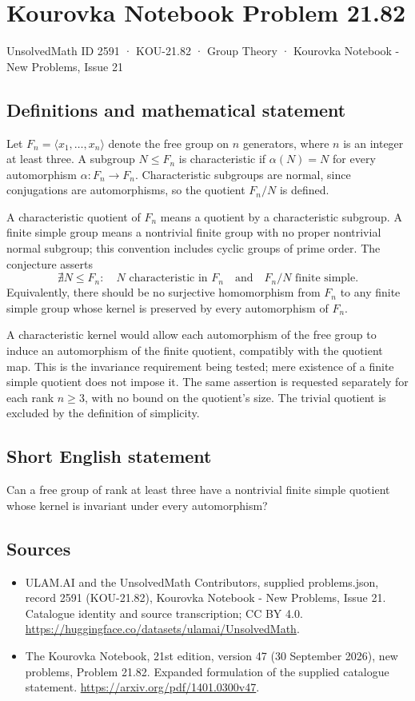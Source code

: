 \documentclass[11pt,a4paper]{article}
\begin{document}
\section*{Kourovka Notebook Problem 21.82}\label{2591}
{\small UnsolvedMath ID 2591 · KOU-21.82 · Group Theory · Kourovka Notebook - New Problems, Issue 21}
\subsection{Definitions and mathematical statement}
Let $F_n=\langle x_1,\ldots,x_n\rangle$ denote the free group on $n$ generators, where $n$ is an integer at least three. A subgroup $N\le F_n$ is characteristic if $\alpha(N)=N$ for every automorphism $\alpha:F_n\to F_n$. Characteristic subgroups are normal, since conjugations are automorphisms, so the quotient $F_n/N$ is defined.

A characteristic quotient of $F_n$ means a quotient by a characteristic subgroup. A finite simple group means a nontrivial finite group with no proper nontrivial normal subgroup; this convention includes cyclic groups of prime order. The conjecture asserts
\[
 \nexists N\le F_n:\quad
 N\text{ characteristic in }F_n
 \quad\text{and}\quad F_n/N\text{ finite simple}.
\]
Equivalently, there should be no surjective homomorphism from $F_n$ to any finite simple group whose kernel is preserved by every automorphism of $F_n$.

A characteristic kernel would allow each automorphism of the free group to induce an automorphism of the finite quotient, compatibly with the quotient map. This is the invariance requirement being tested; mere existence of a finite simple quotient does not impose it. The same assertion is requested separately for each rank $n\ge3$, with no bound on the quotient's size. The trivial quotient is excluded by the definition of simplicity.
\subsection{Short English statement}
Can a free group of rank at least three have a nontrivial finite simple quotient whose kernel is invariant under every automorphism?
\subsection{Sources}
\begin{itemize}
\item[S1] ULAM.AI and the UnsolvedMath Contributors, supplied problems.json, record 2591 (KOU-21.82), Kourovka Notebook - New Problems, Issue 21. Catalogue identity and source transcription; CC BY 4.0.
\url{https://huggingface.co/datasets/ulamai/UnsolvedMath}.
\item[S2] The Kourovka Notebook, 21st edition, version 47 (30 September 2026), new problems, Problem 21.82. Expanded formulation of the supplied catalogue statement.
\url{https://arxiv.org/pdf/1401.0300v47}.
\end{itemize}
\end{document}
